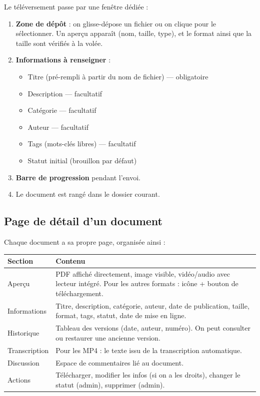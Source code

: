 \documentclass[a4paper,12pt,french]{article}
\begin{document}
Le téléversement passe par une fenêtre dédiée :

\begin{enumerate}[leftmargin=1.5em]
  \item \textbf{Zone de dépôt} : on glisse-dépose un fichier ou on clique pour le sélectionner. Un aperçu apparaît (nom, taille, type), et le format ainsi que la taille sont vérifiés à la volée.
  \item \textbf{Informations à renseigner} :
    \begin{itemize}
      \item Titre (pré-rempli à partir du nom de fichier) — obligatoire
      \item Description — facultatif
      \item Catégorie — facultatif
      \item Auteur — facultatif
      \item Tags (mots-clés libres) — facultatif
      \item Statut initial (brouillon par défaut)
    \end{itemize}
  \item \textbf{Barre de progression} pendant l'envoi.
  \item Le document est rangé dans le dossier courant.
\end{enumerate}

\subsection{Page de détail d'un document}

Chaque document a sa propre page, organisée ainsi :

\begin{tabularx}{\textwidth}{l X}
\toprule
\textbf{Section} & \textbf{Contenu} \\
\midrule
Aperçu & PDF affiché directement, image visible, vidéo/audio avec lecteur intégré. Pour les autres formats : icône + bouton de téléchargement. \\
\addlinespace
Informations & Titre, description, catégorie, auteur, date de publication, taille, format, tags, statut, date de mise en ligne. \\
\addlinespace
Historique & Tableau des versions (date, auteur, numéro). On peut consulter ou restaurer une ancienne version. \\
\addlinespace
Transcription & Pour les MP4 : le texte issu de la transcription automatique. \\
\addlinespace
Discussion & Espace de commentaires lié au document. \\
\addlinespace
Actions & Télécharger, modifier les infos (si on a les droits), changer le statut (admin), supprimer (admin). \\
\bottomrule
\end{tabularx}
\end{document}
